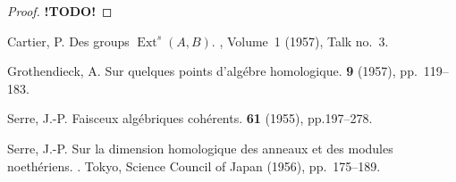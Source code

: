 \documentclass{article}
\theoremstyle{plain}
\theoremstyle{definition}
\DeclareMathOperator{\Ext}{Ext}
\newcommand{\todo}{\textbf{ !TODO! }}
\begin{document}
\begin{proof}
  \todo
\end{proof}



\nocite{*}

\begin{thebibliography}{4}

  {\sc Cartier, P.}
  \newblock Des groups $\Ext^s(A,B)$.
  , Volume~1 (1957), Talk no.~3.

  {\sc Grothendieck, A.}
  \newblock Sur quelques points d'alg\'{e}bre homologique.
   {\bf 9} (1957), pp.~119--183.

  {\sc Serre, J.-P.}
  \newblock Faisceux alg\'{e}briques coh\'{e}rents.
   {\bf 61} (1955), pp.197--278.

  {\sc Serre, J.-P.}
  \newblock Sur la dimension homologique des anneaux et des modules noeth\'{e}riens.
  .
  \newblock Tokyo, Science Council of Japan (1956), pp.~175--189.

\end{thebibliography}
\end{document}
